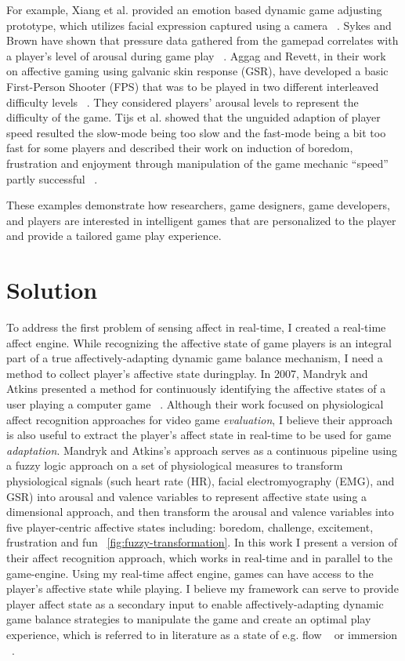 For example, Xiang et al. provided an emotion based dynamic game adjusting prototype, which utilizes facial expression captured using a camera ~\cite{xiang2013dynamic}. Sykes and Brown have shown that pressure data gathered from the gamepad correlates with a player's level of arousal during game play ~\cite{sykes2003affective}. Aggag and Revett, in their work on affective gaming using galvanic skin response (GSR), have developed a basic First-Person Shooter (FPS) that was to be played in two different interleaved difficulty levels ~\cite{aggag2011affective}. They considered players' arousal levels to represent the difficulty of the game. Tijs et al. showed that the unguided adaption of player speed resulted the slow-mode being too slow and the fast-mode being a bit too fast for some players and described their work on induction of boredom, frustration and enjoyment through manipulation of the game mechanic “speed” partly successful ~\cite{tijs2009creating}.

These examples demonstrate how researchers, game designers, game developers, and players are interested in intelligent games that are personalized to the player and provide a tailored game play experience.

\section{Solution}
To address the first problem of sensing affect in real-time, I created a real-time affect engine. While recognizing the affective state of game players is an integral part of a true affectively-adapting dynamic game balance mechanism, I need a method to collect player's affective state duringplay. In 2007, Mandryk and Atkins presented a method for continuously identifying the affective states of a user playing a computer game ~\cite{mandryk2007fuzzy}. Although their work focused on physiological affect recognition approaches for video game \textit{evaluation}, I believe their approach is also useful to extract the player's affect state in real-time to be used for game \textit{adaptation}. Mandryk and Atkins's approach serves as a continuous pipeline using a fuzzy logic approach on a set of physiological measures to transform physiological signals (such heart rate (HR), facial electromyography (EMG), and GSR) into arousal and valence variables to represent affective state using a dimensional approach, and then transform the arousal and valence variables into five player-centric affective states including: boredom, challenge, excitement, frustration and fun ~\ref{fig:fuzzy-transformation}. In this work I present a version of their affect recognition approach, which works in real-time and in parallel to the game-engine. Using my real-time affect engine, games can have access to the player's affective state while playing. I believe my framework can serve to provide player affect state as a secondary input to enable affectively-adapting dynamic game balance strategies to manipulate the game and create an optimal play experience, which is referred to in literature as a state of e.g. flow ~\cite{chen2007flow} or immersion ~\cite{nacke2008flow}.

